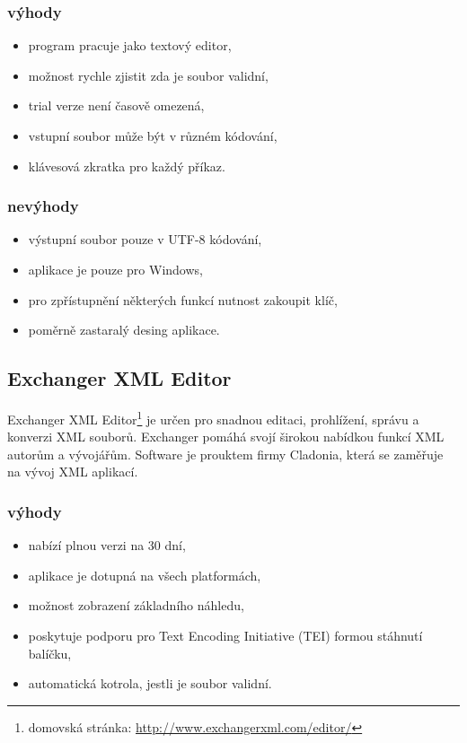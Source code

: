             \subsubsection{výhody}
                \begin{itemize}
                    \item program pracuje jako textový editor,
                    \item možnost rychle zjistit zda je soubor validní,
                    \item trial verze není časově omezená,
                    \item vstupní soubor může být v různém kódování,
                    \item klávesová zkratka pro každý příkaz.
                \end{itemize}
                
            \subsubsection{nevýhody}
                \begin{itemize}
                    \item výstupní soubor pouze v UTF-8 kódování,
                    \item aplikace je pouze pro Windows,
                    \item pro zpřístupnění některých funkcí nutnost zakoupit klíč,
                    \item poměrně zastaralý desing aplikace.
                \end{itemize}

        \subsection{Exchanger XML Editor}
            Exchanger XML Editor\footnote{domovská stránka: \url{http://www.exchangerxml.com/editor/}} je určen pro snadnou editaci, prohlížení, správu a konverzi XML souborů. Exchanger pomáhá svojí širokou nabídkou funkcí XML autorům a vývojářům.  Software je prouktem firmy Cladonia, která se zaměřuje na vývoj XML aplikací. 
            
            \subsubsection{výhody}
                \begin{itemize}
                    \item nabízí plnou verzi na 30 dní,
                    \item aplikace je dotupná na všech platformách,
                    \item možnost zobrazení základního náhledu,
                    \item poskytuje podporu pro Text Encoding Initiative (TEI) formou stáhnutí balíčku,
                    \item automatická kotrola, jestli je soubor validní.
                \end{itemize}
                
